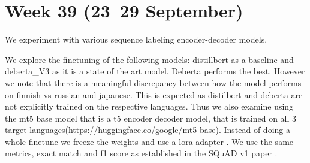 \documentclass[11pt]{article}
\begin{document}
\section{Week 39 (23--29 September)}

We experiment with various sequence labeling encoder-decoder models. 

We explore the finetuning of the following models:
distillbert as a baseline and deberta\_V3 as it is a state of the art model. Deberta performs the best.
However we note that there is a meaningful discrepancy between how the model performs on finnish vs russian and japanese. 
This is expected as distilbert and deberta are not explicitly trained on the respective languages.
Thus we also examine using the mt5 base model that is a t5 encoder decoder model, that is trained on all 3 target languages(https://huggingface.co/google/mt5-base).
Instead of doing a whole finetune we freeze the weights and use a lora adapter \cite{hu2021loralowrankadaptationlarge}. 
We use the same metrics, exact match and f1 score as established in the SQuAD v1 paper \cite{rajpurkar-etal-2018-know}.
\end{document}
